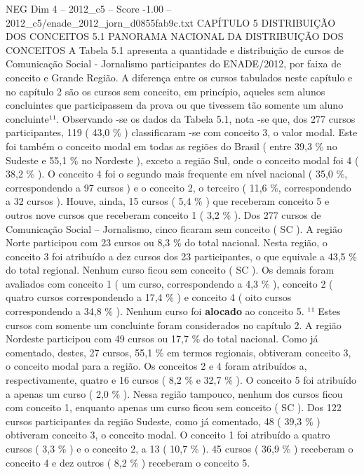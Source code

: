 \begin{textsample}{NEG Dim 4 – 2012\_c5 – Score -1.00 – 2012\_c5/enade\_2012\_jorn\_d0855fab9c.txt}  \label{ex:f4_neg_110}
CAPÍTULO 5 DISTRIBUIÇÃO DOS CONCEITOS 5.1 PANORAMA NACIONAL DA DISTRIBUIÇÃO DOS CONCEITOS A Tabela 5.1 apresenta a quantidade e distribuição de cursos de Comunicação Social - Jornalismo participantes do ENADE/2012, por faixa de conceito e Grande Região.
A diferença entre os cursos tabulados neste capítulo e no capítulo 2 são os cursos sem conceito, em princípio, aqueles sem alunos concluintes que participassem da prova ou que tivessem tão somente um aluno concluinte¹¹.
Observando -se os dados da Tabela 5.1, nota -se que, dos 277 cursos participantes, 119 ( 43,0 \% ) classificaram -se com conceito 3, o valor modal.
Este foi também o conceito modal em todas as regiões do Brasil ( entre 39,3 \% no Sudeste e 55,1 \% no Nordeste ), exceto a região Sul, onde o conceito modal foi 4 ( 38,2 \% ).
O conceito 4 foi o segundo mais frequente em nível nacional ( 35,0 \%, correspondendo a 97 cursos ) e o conceito 2, o terceiro ( 11,6 \%, correspondendo a 32 cursos ).
Houve, ainda, 15 cursos ( 5,4 \% ) que receberam conceito 5 e outros nove cursos que receberam conceito 1 ( 3,2 \% ).
Dos 277 cursos de Comunicação Social – Jornalismo, cinco ficaram sem conceito ( SC ).
A região Norte participou com 23 cursos ou 8,3 \% do total nacional.
Nesta região, o conceito 3 foi atribuído a dez cursos dos 23 participantes, o que equivale a 43,5 \% do total regional.
Nenhum curso ficou sem conceito ( SC ).
Os demais foram avaliados com conceito 1 ( um curso, correspondendo a 4,3 \% ), conceito 2 ( quatro cursos correspondendo a 17,4 \% ) e conceito 4 ( oito cursos correspondendo a 34,8 \% ).
Nenhum curso foi \textbf{alocado} ao conceito 5. ¹¹ Estes cursos com somente um concluinte foram considerados no capítulo 2.
A região Nordeste participou com 49 cursos ou 17,7 \% do total nacional.
Como já comentado, destes, 27 cursos, 55,1 \% em termos regionais, obtiveram conceito 3, o conceito modal para a região.
Os conceitos 2 e 4 foram atribuídos a, respectivamente, quatro e 16 cursos ( 8,2 \% e 32,7 \% ).
O conceito 5 foi atribuído a apenas um curso ( 2,0 \% ).
Nessa região tampouco, nenhum dos cursos ficou com conceito 1, enquanto apenas um curso ficou sem conceito ( SC ).
Dos 122 cursos participantes da região Sudeste, como já comentado, 48 ( 39,3 \% ) obtiveram conceito 3, o conceito modal.
O conceito 1 foi atribuído a quatro cursos ( 3,3 \% ) e o conceito 2, a 13 ( 10,7 \% ). 45 cursos ( 36,9 \% ) receberam o conceito 4 e dez outros ( 8,2 \% ) receberam o conceito 5.

\end{textsample}
